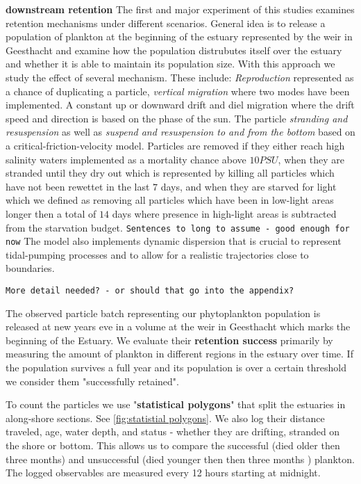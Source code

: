 \textbf{downstream retention}
The first and major experiment of this studies examines retention mechanisms under different scenarios.
General idea is to release a population of plankton at the beginning of the estuary represented by the weir in Geesthacht 
and examine how the population distrubutes itself over the estuary and whether it is able to maintain its population size.
With this approach we study the effect of several mechanism. These include:
\textit{Reproduction} represented as a chance of duplicating a particle,
\textit{vertical migration} where two modes have been implemented. 
A constant up or downward drift and diel migration where the drift speed and direction is based on the phase of the sun.
The particle \textit{stranding and resuspension} as well as \textit{suspend and resuspension to and from the bottom}
 based on a critical-friction-velocity model.
Particles are removed if they either reach high salinity waters implemented as a mortality chance above $10 PSU$,
when they are stranded until they dry out which is represented by killing all particles which have not been rewettet
 in the last $7$ days, and when they are starved for light which we defined as removing all particles which have been
 in low-light areas longer then a total of $14$ days where presence in high-light areas is subtracted from the starvation budget.
\texttt{Sentences to long to assume - good enough for now}
The model also implements dynamic dispersion that is crucial to represent tidal-pumping processes 
and to allow for a realistic trajectories close to boundaries.

\smallskip
\texttt{More detail needed? - or should that go into the appendix?}
\smallskip

The observed particle batch representing our phytoplankton population is released at new years eve in a volume at the weir in Geesthacht which marks the beginning of the Estuary.
We evaluate their \textbf{retention success} primarily by measuring the amount of plankton in different regions in the estuary over time.
If the population survives a full year and its population is over a certain threshold we consider them "successfully retained".

To count the particles we use "\textbf{statistical polygons}" that split the estuaries in along-shore sections. 
See  \ref{fig:statistial polygons}.
We also log their distance traveled, age, water depth, and status - whether they are drifting, stranded on the shore or bottom.
This allows us to compare the successful (died older then three months) and unsuccessful (died younger then then three months ) plankton.
The logged observables are measured every 12 hours starting at midnight.

